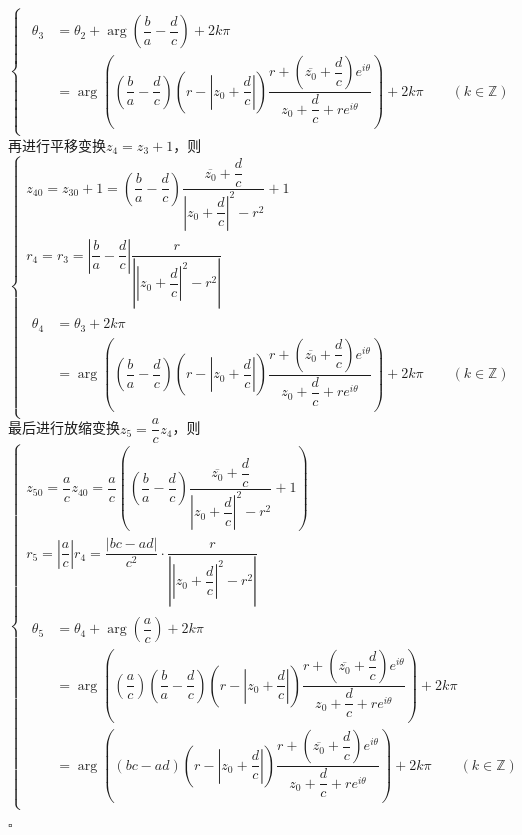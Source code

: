 \documentclass{article}
\newenvironment{SOLUTION}[1][{}]{{\noindent\heiti 解#1：}}{\hfill $\square$\par}
\begin{document}
\begin{SOLUTION}
\begin{itemize}
\begin{equation}
\begin{cases}
\begin{split}
        \theta_3&=\theta_2+\arg\left(\dfrac{b}{a}-\dfrac{d}{c}\right)+2k\pi\\
        &=\arg \left(\left(\dfrac{b}{a}-\dfrac{d}{c}\right)\left(r-\left|z_0+\dfrac{d}{c}\right|\right)\dfrac{r+\left(\overline{z_0}+\dfrac{d}{c}\right)e^{i\theta}}{z_0+\dfrac{d}{c}+re^{i\theta}}\right)+2k\pi\qquad (k\in \mathbb{Z})  
    \end{split}
    \end{cases}
    \end{equation}
    再进行平移变换$z_4=z_3+1$，则
    \begin{equation}
    \begin{cases}
    z_{40} =z_{30}+1=\left(\dfrac{b}{a}-\dfrac{d}{c}\right)\dfrac{\overline{z_0}+\dfrac{d}{c}}{\left|z_0+\dfrac{d}{c}\right|^2-r^2}+1\\
    r_4 = r_3=\left|\dfrac{b}{a}-\dfrac{d}{c}\right|\dfrac{r}{\left|\left|z_0+\dfrac{d}{c}\right|^2-r^2\right|}\\
    \begin{split}
        \theta_4  &= \theta_3+2k\pi\\
        &=\arg \left(\left(\dfrac{b}{a}-\dfrac{d}{c}\right)\left(r-\left|z_0+\dfrac{d}{c}\right|\right)\dfrac{r+\left(\overline{z_0}+\dfrac{d}{c}\right)e^{i\theta}}{z_0+\dfrac{d}{c}+re^{i\theta}}\right)+2k\pi \qquad(k\in\mathbb{Z})   
    \end{split}
    \end{cases}
    \end{equation}
    最后进行放缩变换$z_5=\dfrac{a}{c}z_4$，则
    \begin{equation}
    \begin{cases}
    z_{50}=\dfrac{a}{c}z_{40}=\dfrac{a}{c}\left(\left(\dfrac{b}{a}-\dfrac{d}{c}\right)\dfrac{\overline{z_0}+\dfrac{d}{c}}{\left|z_0+\dfrac{d}{c}\right|^2-r^2}+1\right)\\[2ex]
    r_5 = \left|\dfrac{a}{c}\right|r_4=\dfrac{|bc-ad|}{c^2}\cdot\dfrac{r}{\left|\left|z_0+\dfrac{d}{c}\right|^2-r^2\right|}\\[2ex]
    \begin{split}
        \theta_5&=\theta_4+\arg\left(\dfrac{a}{c}\right)+2k\pi\\& = \arg \left(\left(\dfrac{a}{c}\right)\left(\dfrac{b}{a}-\dfrac{d}{c}\right)\left(r-\left|z_0+\dfrac{d}{c}\right|\right)\dfrac{r+\left(\overline{z_0}+\dfrac{d}{c}\right)e^{i\theta}}{z_0+\dfrac{d}{c}+re^{i\theta}}\right)+2k\pi\\
        &= \arg \left((bc-ad)\left(r-\left|z_0+\dfrac{d}{c}\right|\right)\dfrac{r+\left(\overline{z_0}+\dfrac{d}{c}\right)e^{i\theta}}{z_0+\dfrac{d}{c}+re^{i\theta}}\right)+2k\pi\qquad(k\in\mathbb{Z})
    \end{split} 
    \end{cases}
    \label{ans:1}
    \end{equation}


\end{itemize}
\end{SOLUTION}
\end{document}
